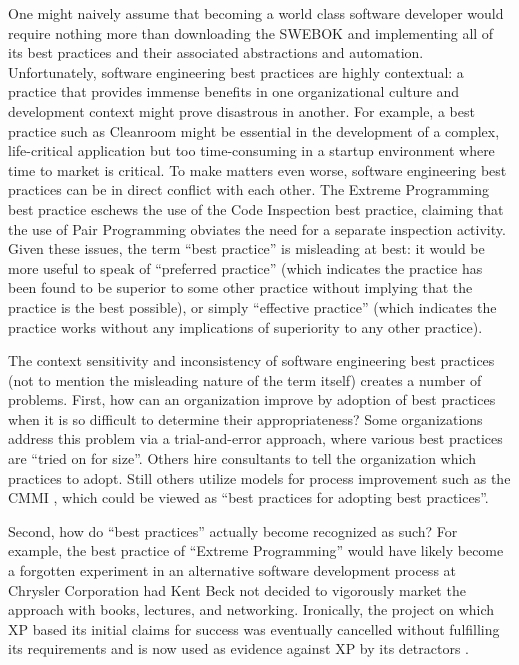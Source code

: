 One might naively assume that becoming a world class software developer
would require nothing more than downloading the SWEBOK and implementing all
of its best practices and their associated abstractions and automation.
Unfortunately, software engineering best practices are highly contextual: a
practice that provides immense benefits in one organizational culture and
development context might prove disastrous in another. For example, a best
practice such as Cleanroom might be essential in the development of a
complex, life-critical application but too time-consuming in a startup
environment where time to market is critical.  To make matters even worse, software
engineering best practices can be in direct conflict with each other.  The
Extreme Programming \cite{Beck00} best practice eschews the use of the Code
Inspection \cite{Fagan76} best practice, claiming that the use of Pair
Programming obviates the need for a separate inspection activity.  Given
these issues, the term ``best practice'' is misleading at best: it would be
more useful to speak of ``preferred practice'' (which indicates the practice
has been found to be superior to some other practice without implying that
the practice is the best possible), or simply ``effective practice'' (which
indicates the practice works without any implications of superiority to any
other practice).  

The context sensitivity and inconsistency of software engineering best
practices (not to mention the misleading nature of the term itself) creates
a number of problems. First, how can an organization improve by adoption of
best practices when it is so difficult to determine their appropriateness?
Some organizations address this problem via a trial-and-error approach,
where various best practices are ``tried on for size''.  Others hire
consultants to tell the organization which practices to adopt. Still others
utilize models for process improvement such as the CMMI \cite{Royce02},
which could be viewed as ``best practices for adopting best practices''.

Second, how do ``best practices'' actually become recognized as such?  For
example, the best practice of ``Extreme Programming'' would have likely 
become a forgotten experiment in an alternative software development
process at Chrysler Corporation had Kent Beck not decided to vigorously
market the approach with books, lectures, and networking.  Ironically, the
project on which XP based its initial claims for success was eventually
cancelled without fulfilling its requirements and is now used as evidence
against XP by its detractors \cite{Keefer03}.

